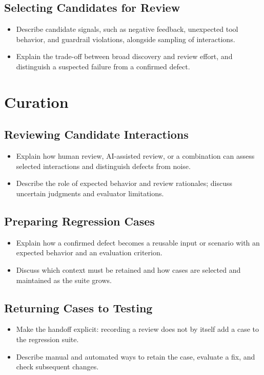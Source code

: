 \subsection{Selecting Candidates for Review}
\begin{itemize}
  \item Describe candidate signals, such as negative feedback, unexpected tool
    behavior, and guardrail violations, alongside sampling of interactions.
  \item Explain the trade-off between broad discovery and review effort, and
    distinguish a suspected failure from a confirmed defect.
\end{itemize}

\section{Curation}
\label{sec:cd4ai-curation}

\subsection{Reviewing Candidate Interactions}
\begin{itemize}
  \item Explain how human review, AI-assisted review, or a combination can assess
    selected interactions and distinguish defects from noise.
  \item Describe the role of expected behavior and review rationales; discuss
    uncertain judgments and evaluator limitations.
\end{itemize}

\subsection{Preparing Regression Cases}
\begin{itemize}
  \item Explain how a confirmed defect becomes a reusable input or scenario with
    an expected behavior and an evaluation criterion.
  \item Discuss which context must be retained and how cases are selected and
    maintained as the suite grows.
\end{itemize}

\subsection{Returning Cases to Testing}
\begin{itemize}
  \item Make the handoff explicit: recording a review does not by itself add a
    case to the regression suite.
  \item Describe manual and automated ways to retain the case, evaluate a fix,
    and check subsequent changes.
\end{itemize}

